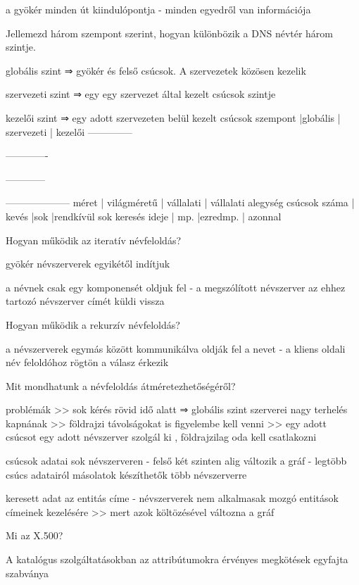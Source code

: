 \documentclass[12pt]{article}
\begin{document}
\begin{description}
    \item a gyökér minden út kiindulópontja
        - minden egyedről van információja
    \item  Jellemezd három szempont szerint, hogyan különbözik a DNS névtér három szintje.
    \item globális szint   ⇒ gyökér és felső csúcsok. A szervezetek közösen kezelik
    \item szervezeti szint ⇒ egy egy szervezet által kezelt csúcsok szintje
    \item kezelői szint    ⇒ egy adott szervezeten belül kezelt csúcsok
        szempont      |globális     | szervezeti | kezelői
        --------------\item-------------\item------------\item--------------------
        méret         | világméretű | vállalati  | vállalati alegység
        csúcsok száma | kevés       |sok         |rendkívül sok
        keresés ideje | mp.         |ezredmp.    | azonnal
    \item  Hogyan működik az iteratív névfeloldás?
    \item gyökér névszerverek egyikétől indítjuk
    \item a névnek csak egy komponensét oldjuk fel
        - a megszólított névszerver az ehhez tartozó névszerver címét küldi vissza
    \item  Hogyan működik a rekurzív névfeloldás?
    \item a névszerverek egymás között kommunikálva oldják fel a nevet
        - a kliens oldali név feloldóhoz rögtön a válasz érkezik
    \item  Mit mondhatunk a névfeloldás átméretezhetőségéről?
    \item problémák 
        >> sok kérés rövid idő alatt ⇒ globális szint szerverei nagy terhelés kapnának
        >> földrajzi távolságokat is figyelembe kell venni
        >> egy adott csúcsot egy adott névszerver szolgál ki , földrajzilag oda kell csatlakozni
    \item csúcsok adatai sok névszerveren
        - felső két szinten alig változik a gráf
        - legtöbb csúcs adatairól másolatok készíthetők több névszerverre
    \item keresett adat az entitás címe
        - névszerverek nem alkalmasak mozgó entitások címeinek kezelésére >>  mert azok költözésével változna a gráf
    \item  Mi az X.500?
    \item A katalógus szolgáltatásokban az attribútumokra érvényes megkötések egyfajta szabványa

\end{description}
\end{document}
